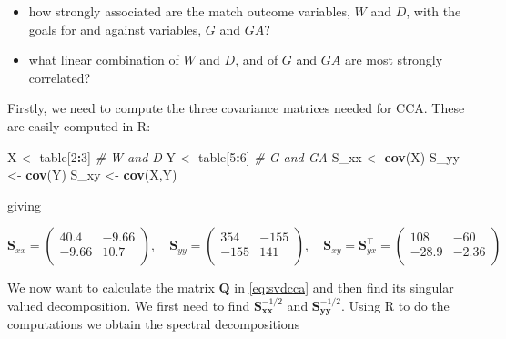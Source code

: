 \documentclass[]{book}
\newenvironment{Shaded}{\begin{snugshade}}{\end{snugshade}}
\newcommand{\CommentTok}[1]{\textcolor[rgb]{0.56,0.35,0.01}{\textit{#1}}}
\newcommand{\DecValTok}[1]{\textcolor[rgb]{0.00,0.00,0.81}{#1}}
\newcommand{\KeywordTok}[1]{\textcolor[rgb]{0.13,0.29,0.53}{\textbf{#1}}}
\newcommand{\NormalTok}[1]{#1}
\newcommand{\OperatorTok}[1]{\textcolor[rgb]{0.81,0.36,0.00}{\textbf{#1}}}
\newcommand{\StringTok}[1]{\textcolor[rgb]{0.31,0.60,0.02}{#1}}
\providecommand{\tightlist}{%
  \setlength{\itemsep}{0pt}\setlength{\parskip}{0pt}}
\theoremstyle{definition}
\theoremstyle{definition}
\theoremstyle{definition}
\theoremstyle{remark}
\begin{document}
\begin{itemize}
\tightlist
\item
  how strongly associated are the match outcome variables, \(W\) and \(D\), with the goals for and against variables, \(G\) and \(GA\)?
\item
  what linear combination of \(W\) and \(D\), and of \(G\) and \(GA\) are most strongly correlated?
\end{itemize}

Firstly, we need to compute the three covariance matrices needed for CCA. These are easily computed in R:

\begin{Shaded}
\begin{Highlighting}[]
\NormalTok{X <-}\StringTok{ }\NormalTok{table[}\DecValTok{2}\OperatorTok{:}\DecValTok{3}\NormalTok{] }\CommentTok{# W and D}
\NormalTok{Y <-}\StringTok{ }\NormalTok{table[}\DecValTok{5}\OperatorTok{:}\DecValTok{6}\NormalTok{] }\CommentTok{# G and GA}
\NormalTok{S_xx <-}\StringTok{ }\KeywordTok{cov}\NormalTok{(X)}
\NormalTok{S_yy <-}\StringTok{ }\KeywordTok{cov}\NormalTok{(Y)}
\NormalTok{S_xy <-}\StringTok{ }\KeywordTok{cov}\NormalTok{(X,Y)}
\end{Highlighting}
\end{Shaded}

giving

\[\boldsymbol S_{xx} =\begin{pmatrix}40.4&-9.66 \\-9.66&10.7 \\\end{pmatrix}, \quad \boldsymbol S_{yy} =\begin{pmatrix}354&-155 \\-155&141 \\\end{pmatrix}, \quad \boldsymbol S_{xy}=\boldsymbol S_{yx}^\top =\begin{pmatrix}108&-60 \\-28.9&-2.36 \\\end{pmatrix}\]

We now want to calculate the matrix \(\boldsymbol Q\) in \eqref{eq:svdcca} and then find its singular valued decomposition. We first need to find \(\boldsymbol S_{\boldsymbol x\boldsymbol x}^{-1/2}\) and \(\boldsymbol S_{\boldsymbol y\boldsymbol y}^{-1/2}\). Using R to do the computations we obtain the spectral decompositions

\begin{Shaded}
\end{Shaded}
\end{document}
